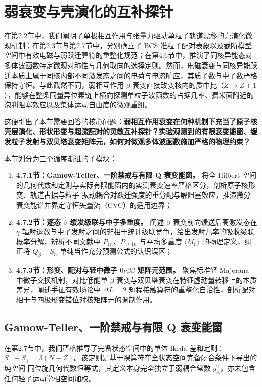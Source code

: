 \section{弱衰变与壳演化的互补探针}\label{sec:4-7}

在第2.2节中，我们阐明了单极相互作用与张量力驱动单粒子轨道漂移的壳演化微观机制；在第2.3节与第2.7节中，分别确立了 BCS 准粒子配对表象以及截断模型空间中有效电磁与弱跃迁算符的重整化规范；在第4.6节中，推演了同核异能态对多体波函数特定微观对称性与几何取向的选择定则。然而，电磁衰变与同核异能跃迁本质上属于同核内部不同激发态之间的电荷与电流响应，其质子数与中子数严格保持守恒。与此截然不同，弱相互作用 $\beta$ 衰变直接改变核内的质中比（$Z \to Z \pm 1$），能够在整条同量异位素链上横向探测单粒子波函数的占据几率、费米面附近的泡利阻塞效应以及集体运动自由度的微观重组。

这便引出了本节需要回答的核心问题：\textbf{弱相互作用衰变在何种机制下充当了原子核壳层演化、形状形变与超流配对的灵敏互补探针？实验观测到的有限衰变能窗、缓发粒子发射与双贝塔衰变矩阵元，如何对微观多体波函数施加严格的物理约束？}

本节划分为三个循序渐进的子模块：
\begin{enumerate}
\item \textbf{4.7.1节：Gamow-Teller、一阶禁戒与有限 Q 衰变能窗。} 将全 Hilbert 空间的几何代数和定则与实际有限能窗内的实测衰变速率严格区分，剖析原子核形变、轨道占据与粒子-振动耦合对跃迁强度的重分配与解阻塞效应，推演微分衰变能谱并界定守恒矢量流（CVC）的适用边界；
\item \textbf{4.7.2节：逐态 $\beta$ 缓发级联与中子多重度。} 阐述 $\beta$ 衰变前向馈送后高激发态在 $\gamma$ 辐射退激与中子发射之间的非相干统计级联竞争，给出发射几率的吸收级联概率分解，辨析不同文献中 $P_{1n}$、$P_{\ge 1n}$ 与平均多重度 $\langle M_n \rangle$ 的物理定义，纠正将 $Q_\beta - S_n$ 单纯当作充分预测公式的认识误区；
\item \textbf{4.7.3节：形变、配对与轻中微子 $0\nu\beta\beta$ 矩阵元范围。} 聚焦标准轻 Majorana 中微子交换机制，对比低能单 $\beta$ 衰变与双贝塔衰变在特征虚动量转移上的本质差异，阐述手征有效场论中 $\Delta L = 2$ 短程接触算符的重整化自洽性，剖析配对相干与四极形变错位对核矩阵元的调制作用。
\end{enumerate}

\subsection{Gamow-Teller、一阶禁戒与有限 Q 衰变能窗}\label{sec:4-7-1}

在第2.7节中，我们严格推导了完备状态空间中的单体 Ikeda 差和定则：$S_- - S_+ = 3(N - Z)$。该定则是基于裸算符在全状态空间完备闭合条件下导出的纯空间-同位旋几何代数恒等式，其定义本身完全独立于弱耦合常数 $g_A^2$，亦未包含任何轻子运动学相空间加权。

